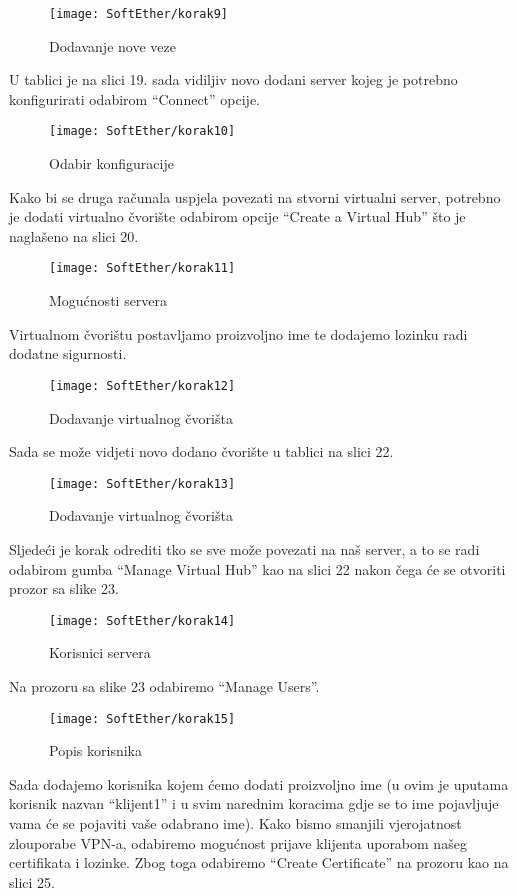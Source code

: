 \begin{figure}[h!]
     \centering
     \texttt{[image: SoftEther/korak9]}
     \caption{Dodavanje nove veze}
\end{figure}
\FloatBarrier
U tablici je na slici 19. sada vidiljiv novo dodani server kojeg je potrebno konfigurirati odabirom ``Connect'' opcije.
\begin{figure}[h!]
     \centering
     \texttt{[image: SoftEther/korak10]}
     \caption{Odabir konfiguracije}
\end{figure}
\FloatBarrier
Kako bi se druga računala uspjela povezati na stvorni virtualni server, potrebno je dodati virtualno čvorište odabirom opcije ``Create a Virtual Hub'' što je naglašeno na slici 20.
\begin{figure}[h!]
     \centering
     \texttt{[image: SoftEther/korak11]}
     \caption{Mogućnosti servera}
\end{figure}
\FloatBarrier
Virtualnom čvorištu postavljamo proizvoljno ime te dodajemo lozinku radi dodatne sigurnosti.
\begin{figure}[h!]
     \centering
     \texttt{[image: SoftEther/korak12]}
     \caption{Dodavanje virtualnog čvorišta}
\end{figure}
\FloatBarrier
Sada se može vidjeti novo dodano čvorište u tablici na slici 22.
\begin{figure}[h!]
     \centering
     \texttt{[image: SoftEther/korak13]}
     \caption{Dodavanje virtualnog čvorišta}
\end{figure}
\FloatBarrier
Sljedeći je korak odrediti tko se sve može povezati na naš server, a to se radi odabirom gumba ``Manage Virtual Hub'' kao na slici 22 nakon čega će se otvoriti prozor sa slike 23.
\begin{figure}[h!]
     \centering
     \texttt{[image: SoftEther/korak14]}
     \caption{Korisnici servera}
\end{figure}
\FloatBarrier
Na prozoru sa slike 23 odabiremo ``Manage Users''.
\begin{figure}[h!]
     \centering
     \texttt{[image: SoftEther/korak15]}
     \caption{Popis korisnika}
\end{figure}
\FloatBarrier
Sada dodajemo korisnika kojem ćemo dodati proizvoljno ime (u ovim je uputama korisnik nazvan ``klijent1'' i u svim narednim koracima gdje se to ime pojavljuje vama će se pojaviti vaše odabrano ime). Kako bismo smanjili vjerojatnost zlouporabe VPN-a, odabiremo mogućnost prijave klijenta uporabom našeg certifikata i lozinke. Zbog toga odabiremo ``Create Certificate'' na prozoru kao na slici 25.
